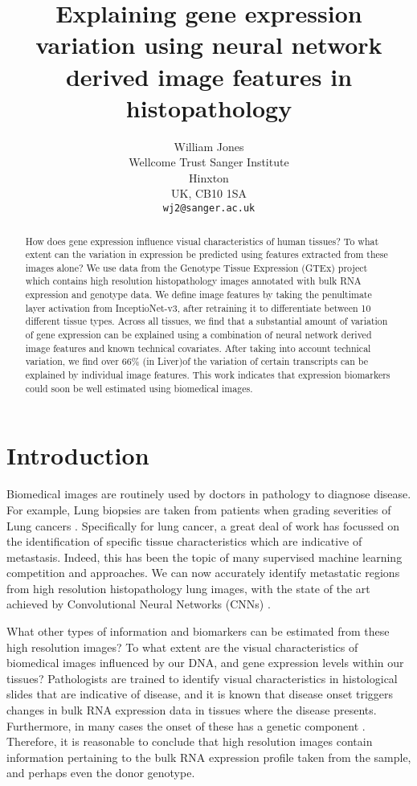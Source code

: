 \documentclass{article}
\title{Explaining gene expression variation using neural network derived image features in histopathology}
\author{
  William Jones\\
  Wellcome Trust Sanger Institute\\
  Hinxton\\
  UK, CB10 1SA \\
  \texttt{wj2@sanger.ac.uk} \\
}
\begin{document}

\maketitle

\begin{abstract}
How does gene expression influence visual characteristics of human tissues? To what extent can the variation in expression be predicted using features extracted from these images alone? We use data from the Genotype Tissue Expression (GTEx) project which contains high resolution histopathology images annotated with bulk RNA expression and genotype data. We define image features by taking the penultimate layer activation from InceptioNet-v3, after retraining it to differentiate between 10 different tissue types. Across all tissues, we find that a substantial amount of variation of gene expression can be explained using a combination of neural network derived image features and known technical covariates. After taking into account technical variation, we find over 66\% (in Liver)of the variation of certain transcripts can be explained by individual image features. This work indicates that expression biomarkers could soon be well estimated using biomedical images. \end{abstract}

\section{Introduction}
Biomedical images are routinely used by doctors in pathology to diagnose disease. For example, Lung biopsies are taken from patients when grading severities of Lung cancers \cite{histology-classification-lung-cancer}. Specifically for lung cancer, a great deal of work has focussed on the identification of specific tissue characteristics which are indicative of metastasis. Indeed, this has been the topic of many supervised machine learning competition and approaches. We can now accurately identify metastatic regions from high resolution histopathology lung images, with the state of the art achieved by Convolutional Neural Networks (CNNs) \cite{detecting-cancer-metastases}.

What other types of information and biomarkers can be estimated from these high resolution images? To what extent are the visual characteristics of biomedical images influenced by our DNA, and gene expression levels within our tissues? Pathologists are trained to identify visual characteristics in histological slides that are indicative of disease, and it is known that disease onset triggers changes in bulk RNA expression data in tissues where the disease presents. \cite{gene-expression-parkinsons} Furthermore, in many cases the onset of these has a genetic component \cite{what-is-complex-about-complex-disorders}. Therefore, it is reasonable to conclude that high resolution images contain information pertaining to the bulk RNA expression profile taken from the sample, and perhaps even the donor genotype.
\end{document}
